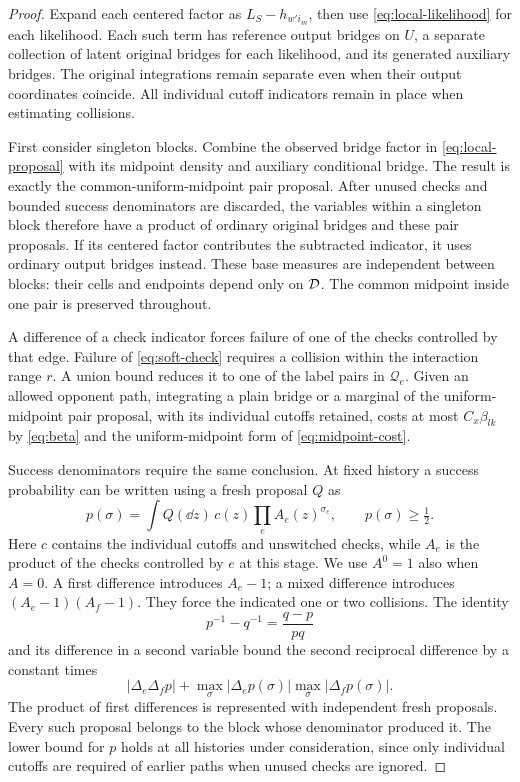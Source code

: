 \begin{proof}
Expand each centered factor as $L_S-h_{w'i_m}$, then use
\eqref{eq:local-likelihood} for each likelihood.  Each such term has
reference output bridges on $U$, a separate collection of latent
original bridges for each likelihood, and its generated auxiliary
bridges.  The original integrations remain separate even when their
output coordinates coincide.  All individual cutoff indicators
remain in place when estimating collisions.

First consider singleton blocks.  Combine the observed bridge factor
in \eqref{eq:local-proposal} with its midpoint density and auxiliary
conditional bridge.  The result is exactly the common-uniform-midpoint
pair proposal.  After unused checks and bounded success denominators
are discarded, the variables within a singleton block therefore have
a product of ordinary original bridges and these pair proposals.
If its centered factor contributes the subtracted indicator, it uses
ordinary output bridges instead.  These base measures are independent
between blocks: their cells and endpoints depend only on $\mathcal D$.
The common midpoint inside one pair is preserved throughout.

A difference of a check indicator forces failure of one of the checks
controlled by that edge.  Failure of \eqref{eq:soft-check} requires
a collision within the interaction range $r$.  A union bound reduces
it to one of the label pairs in $\mathcal Q_e$.  Given an allowed
opponent path, integrating a plain bridge or a marginal of the
uniform-midpoint pair proposal, with its individual cutoffs retained,
costs at most $C_x\beta_{lk}$ by \eqref{eq:beta} and the
uniform-midpoint form of \eqref{eq:midpoint-cost}.

Success denominators require the same conclusion.  At fixed history
a success probability can be written using a fresh proposal $Q$ as
\[
 p(\sigma)=\int Q(\dd z)\,c(z)
                         \prod_e A_e(z)^{\sigma_e},
                  \qquad p(\sigma)\ge\tfrac12.
\]
Here $c$ contains the individual cutoffs and unswitched checks, while
$A_e$ is the product of the checks controlled by $e$ at this stage.
We use $A^0=1$ also when $A=0$.  A first difference introduces
$A_e-1$; a mixed difference introduces
$(A_e-1)(A_f-1)$.  They force the indicated one or two collisions.
The identity
\[
                 p^{-1}-q^{-1}=\frac{q-p}{pq}
\]
and its difference in a second variable bound the second reciprocal
difference by a constant times
\[
 |\Delta_e\Delta_fp|
       +\max_\sigma|\Delta_ep(\sigma)|
                       \max_\sigma|\Delta_fp(\sigma)|.
\]
The product of first differences is represented with independent
fresh proposals.  Every such proposal belongs to the block whose
denominator produced it.  The lower bound for $p$ holds at all
histories under consideration, since only individual cutoffs are
required of earlier paths when unused checks are ignored.


\end{proof}
